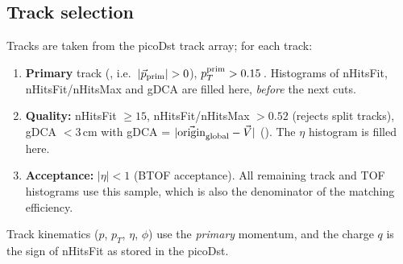 \subsection{Track selection}
\label{sec:trkcuts}
Tracks are taken from the picoDst track array; for each track:
\begin{enumerate}
\item \textbf{Primary} track (, i.e.\ $|\vec p_{\rm prim}|>0$), $p_T^{\rm prim}>0.15$\,\GeVc.
  Histograms of nHitsFit, nHitsFit/nHitsMax and gDCA are filled here, \emph{before} the next cuts.
\item \textbf{Quality:} nHitsFit $\ge 15$, nHitsFit/nHitsMax $>0.52$ (rejects split tracks),
  gDCA $<3$\,cm with gDCA = $|\vec{\rm origin}_{\rm global} - \vec V|$ ().
  The $\eta$ histogram is filled here.
\item \textbf{Acceptance:} $|\eta|<1$ (BTOF acceptance). All remaining track and TOF histograms use
  this sample, which is also the denominator of the matching efficiency.
\end{enumerate}
Track kinematics ($p$, $p_T$, $\eta$, $\phi$) use the \emph{primary} momentum, and the charge $q$ is
the sign of nHitsFit as stored in the picoDst.

